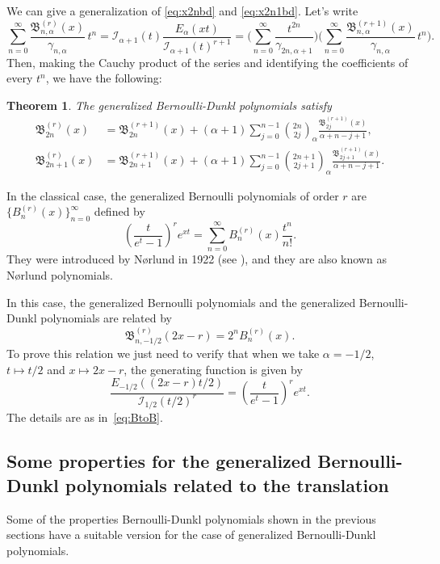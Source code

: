 \documentclass[10pt]{article}
\theoremstyle{plain}
\newtheorem{theorem}{Theorem}[section]
\theoremstyle{definition}
\numberwithin{equation}{section} %
\newcommand{\Ea}{E_{\alpha}}
\newcommand{\binoma}[2]{\binom{#1}{#2}_{\!\alpha}}
\newcommand{\I}{\mathcal{I}}
\newcommand{\B}{\mathfrak{B}}
\newcommand{\cc}{\gamma}
\begin{document}
We can give a generalization of \eqref{eq:x2nbd} and \eqref{eq:x2n1bd}. Let's write
\begin{equation*}
  \sum_{n=0}^\infty \frac{\B_{n,\alpha}^{(r)}(x)}{\cc_{n,\alpha}}\,t^n 
  = \I_{\alpha+1}(t) \frac{\Ea(xt)}{\I_{\alpha+1}(t)^{r+1}} 
  = \biggl(\sum_{n=0}^\infty \frac{t^{2n}}{\cc_{2n,\alpha+1}}\biggr)
  \biggl(\sum_{n=0}^\infty \frac{\B_{n,\alpha}^{(r+1)}(x)}{\cc_{n,\alpha}}\,t^n\biggr).
\end{equation*}
Then, making the Cauchy product of the series and identifying the coefficients of every $t^n$, we have the following:

\begin{theorem}
The generalized Bernoulli-Dunkl polynomials satisfy 
\begin{align}
\label{eq:x2nbdr}
  \B_{2n}^{(r)}(x) &= \B_{2n}^{(r+1)}(x)+(\alpha+1) \sum_{j=0}^{n-1} \binoma{2n}{2j}
  \frac{\B_{2j}^{(r+1)}(x)}{\alpha+n-j+1},
\\
\label{eq:x2n1bdr}
  \B_{2n+1}^{(r)}(x) &= \B_{2n+1}^{(r+1)}(x) + (\alpha+1) \sum_{j=0}^{n-1} \binoma{2n+1}{2j+1}
  \frac{\B_{2j+1}^{(r+1)}(x)}{\alpha+n-j+1}.
\end{align}
\end{theorem}


In the classical case, the generalized Bernoulli polynomials of order $r$ are $\{B_{n}^{(r)}(x)\}_{n=0}^\infty$ defined by
\[
  \left(\frac{t}{e^t-1}\right)^r e^{xt} 
  = \sum_{n=0}^\infty B_{n}^{(r)}(x) \frac{t^n}{n!}.
\]
They were introduced by N{\o}rlund in 1922 (see \cite{Nor,Nor-book}), and they are also known as N{\o}rlund polynomials.

In this case, the generalized Bernoulli polynomials and the generalized Bernoulli-Dunkl polynomials are related by
\[
  \B_{n,-1/2}^{(r)}(2x-r) = 2^n B_n^{(r)}(x).
\]
To prove this relation we just need to verify that when we take $\alpha=-1/2$, $t\mapsto t/2$ and $x\mapsto 2x-r$, the generating function is given by
\[
  \frac{E_{-1/2}((2x-r)t/2)}{\I_{1/2}(t/2)^r} = \left(\frac{t}{e^t-1}\right)^r e^{xt}.
\]
The details are as in~\eqref{eq:BtoB}.

\subsection{Some properties for the generalized Bernoulli-Dunkl polynomials related to the translation}

Some of the properties Bernoulli-Dunkl polynomials shown in the previous sections have a suitable version for the case of generalized Bernoulli-Dunkl polynomials.
\end{document}
